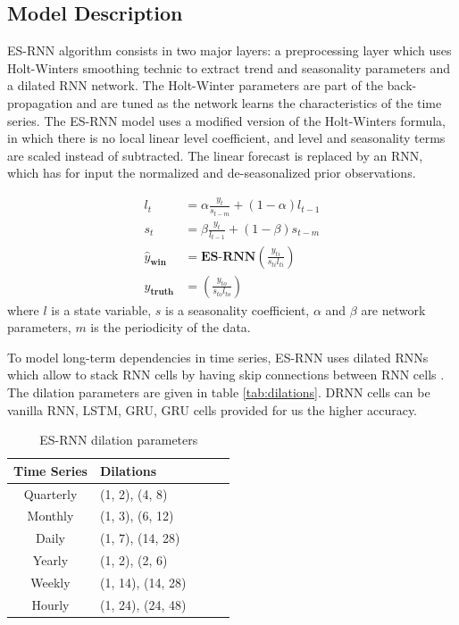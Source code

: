 \documentclass{article}
\begin{document}
\subsection{Model Description}

ES-RNN algorithm consists in two major layers: a preprocessing layer which uses Holt-Winters smoothing technic to extract trend and seasonality parameters and a dilated RNN network.
The Holt-Winter parameters are part of the back-propagation and are tuned as the network learns the characteristics of the time series. The ES-RNN model uses a modified version of the Holt-Winters formula,
in which there is no local linear level coefficient, and level and seasonality terms are scaled instead of subtracted. 
The linear forecast is replaced by an RNN, which has for input the normalized and de-seasonalized prior observations. 


\begin{align*}
	l_t 	&= \alpha \frac{y_t} {s_{t-m}} + (1-\alpha) l_{t-1} \\
	s_t 	&= \beta \frac{y_t}{l_{t-1}} + (1-\beta) s_{t-m} \\
	\hat{y}_{\textbf{win}}		&= \textbf{ES-RNN}(\frac{y_{ti}}{s_{ti} l_{ti}}) \\
	y_{\textbf{truth}}		&= (\frac{y_{to}}{s_{to} l_{to}}) 
\end{align*}
where $l$ is a state variable, $s$ is a seasonality coefficient, $\alpha$ and $\beta$ are network parameters, $m$ is the periodicity of the data.

To model long-term dependencies in time series, ES-RNN uses dilated RNNs which allow to stack RNN cells by having skip connections between RNN cells . 
The dilation parameters  are given in table \autoref{tab:dilations}.  DRNN cells can be vanilla RNN, LSTM, GRU,  GRU cells provided for us the higher accuracy.

\begin{table}[!ht]
	\centering
	\begin{tabular}{clclc} \toprule
		\textbf{Time Series} & \textbf{Dilations} \\ 
		\midrule
		Quarterly  & (1, 2), (4, 8)	\\
		\midrule
		Monthly 	& (1, 3), (6, 12)	\\
		\midrule
		Daily 	& (1, 7), (14, 28)	\\
		\midrule		
		Yearly 	& (1, 2), (2, 6) 	\\
		\midrule		
		Weekly 	& (1, 14), (14, 28)	\\
		\midrule		
		Hourly 	& (1, 24), (24, 48)	\\
	\end{tabular}
	\caption{ES-RNN dilation parameters}
	\label{tab:dilations}
\end{table}
\end{document}
